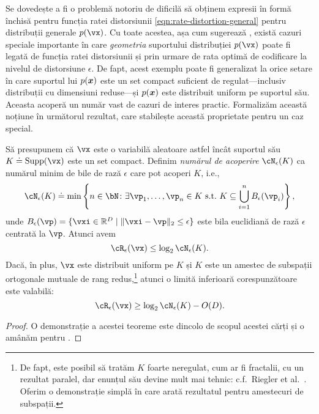 \documentclass[../../book-main_ro.tex]{subfiles}
\begin{document}
Se dovedește a fi o problemă notoriu de dificilă să obținem expresii în formă închisă pentru funcția ratei distorsiunii \eqref{eqn:rate-distortion-general} pentru distribuții generale $p(\vx)$. Cu toate acestea, așa cum sugerează , există cazuri speciale importante în care \textit{geometria} suportului distribuției $p(\vx)$ poate fi legată de funcția ratei distorsiunii și prin urmare de rata optimă de codificare la nivelul de distorsiune $\epsilon$.
De fapt, acest exemplu poate fi generalizat la orice setare în care suportul lui $p(\bm{x})$ este un set compact suficient de regulat—inclusiv distribuții cu dimensiuni reduse—și $p(\bm{x})$ este distribuit uniform pe suportul său.
Aceasta acoperă un număr vast de cazuri de interes practic.
Formalizăm această noțiune în următorul rezultat, care stabilește această proprietate pentru un caz special.

\begin{theorem}\label{thm:covering-number-rate-distortion}
	Să presupunem că \(\vx\) este o variabilă aleatoare astfel încât suportul său \(K \doteq \Supp(\vx)\) este un set compact. Definim \textit{numărul de acoperire} \(\cN_{\epsilon}(K)\) ca numărul minim de bile de rază \(\epsilon\) care pot acoperi \(K\), i.e.,
	\begin{equation}
		\cN_{\epsilon}(K) \doteq \min\left\{n \in \bN \colon \exists \vp_{1}, \dots, \vp_{n} \in K\ \text{s.t.}\ K \subseteq \bigcup_{i = 1}^{n}B_{\epsilon}(\vp_{i})\right\},
	\end{equation}
	unde \(B_{\epsilon}(\vp) = \set{\vxi\in \R^D \given \norm{\vxi - \vp}_2 \leq \epsilon}\) este bila euclidiană de rază \(\epsilon\) centrată la \(\vp\).
	Atunci avem
	\begin{equation}
		\cR_{\epsilon}(\vx) 
		\leq \log_{2} \cN_{\epsilon}(K).
	\end{equation}
	Dacă, în plus, $\vx$ este distribuit uniform pe $K$ și $K$ este un amestec de subspații ortogonale mutuale de rang redus,\footnote{De fapt, este posibil să tratăm $K$ foarte neregulat, cum ar fi fractalii, cu un rezultat paralel, dar enunțul său devine mult mai tehnic: c.f.\ Riegler et al.\ \cite{Riegler2018-jh,Riegler2023-rr}. Oferim o demonstrație simplă în  care arată rezultatul pentru amestecuri de subspații.}
	atunci o limită inferioară corespunzătoare este valabilă:
	\begin{equation}
		\cR_{\epsilon}(\vx)
		\geq
		\log_{2} \cN_{\epsilon}(K) - O(D).
	\end{equation}
\end{theorem}
\begin{proof}
O demonstrație a acestei teoreme este dincolo de scopul acestei cărți și o amânăm pentru .
\end{proof}
\end{document}
